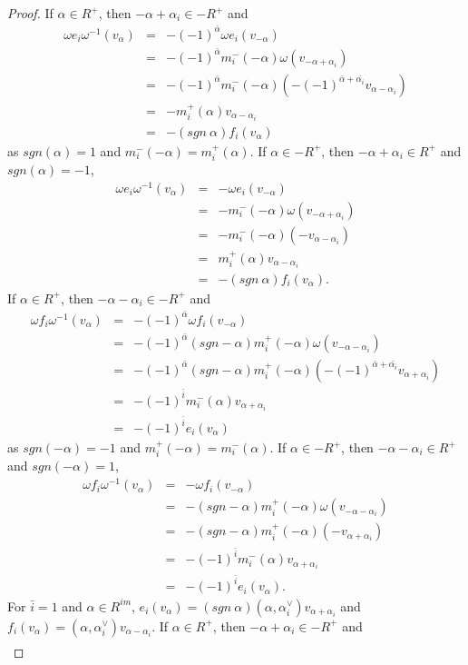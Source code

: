 \documentclass[10pt,a4paper]{amsart}
\newcommand{\al}{\alpha}
\newcommand{\om}{\omega}
\begin{document}
\begin{proof}
		If $\al\in R^+$, then $-\al+\al_i\in-R^+$ and
		\begin{eqnarray*}
			\om e_i\om^{-1}(v_{\al})&=&-(-1)^{\bar{\al}}\om e_i(v_{-\al})\\&=&-(-1)^{\bar{\al}}m_i^-(-\al)\om(v_{-\al+\al_i})\\&=&-(-1)^{\bar{\al}}m_i^-(-\al)(-(-1)^{\bar{\al}+\bar{\al_i}}v_{\al-\al_i})\\&=&-m_i^+(\al)v_{\al-\al_i}\\&=&-(sgn~\al)f_i(v_{\al})
		\end{eqnarray*}
		as $sgn(\al)=1$ and $m_i^-(-\al)=m_i^+(\al)$. If $\al\in-R^+$, then $-\al+\al_i\in R^+$ and $sgn(\al)=-1$,
		\begin{eqnarray*}
			\om e_i\om^{-1}(v_{\al})&=&-\om e_i(v_{-\al})\\&=&-m_i^-(-\al)\om(v_{-\al+\al_i})\\&=&-m_i^-(-\al)(-v_{\al-\al_i})\\&=&m_i^+(\al)v_{\al-\al_i}\\&=&-(sgn~\al)f_i(v_{\al}).
		\end{eqnarray*}
		If $\al\in R^+$, then $-\al-\al_i\in-R^+$ and
		\begin{eqnarray*}
			\om f_i\om^{-1}(v_{\al})&=&-(-1)^{\bar{\al}}\om f_i(v_{-\al})\\&=&-(-1)^{\bar{\al}}(sgn-\al)m_i^+(-\al)\om(v_{-\al-\al_i})\\&=&-(-1)^{\bar{\al}}(sgn-\al)m_i^+(-\al)(-(-1)^{\bar{\al}+\bar{\al_i}}v_{\al+\al_i})\\&=&-(-1)^{\bar{i}}m_i^-(\al)v_{\al+\al_i}\\&=&-(-1)^{\bar{i}}e_i(v_{\al})
		\end{eqnarray*}
		as $sgn(-\al)=-1$ and $m_i^+(-\al)=m_i^-(\al)$. If $\al\in-R^+$, then $-\al-\al_i\in R^+$ and $sgn(-\al)=1$,
		\begin{eqnarray*}
			\om f_i\om^{-1}(v_{\al})&=&-\om f_i(v_{-\al})\\&=&-(sgn-\al)m_i^+(-\al)\om(v_{-\al-\al_i})\\&=&-(sgn-\al)m_i^+(-\al)(-v_{\al+\al_i})\\&=&-(-1)^{\bar{i}}m_i^-(\al)v_{\al+\al_i}\\&=&-(-1)^{\bar{i}}e_i(v_{\al}).
		\end{eqnarray*}
		For $\bar{i}=1$ and $\al\in R^{im}$, $e_i(v_{\al})=(sgn~\al)(\al,\al_i^{\vee})v_{\al+\al_i}$ and $f_i(v_{\al})=(\al,\al_i^{\vee})v_{\al-\al_i}$.
		If $\al\in R^+$, then $-\al+\al_i\in-R^+$ and
		\begin{eqnarray*}

\end{eqnarray*}
\end{proof}
\end{document}
